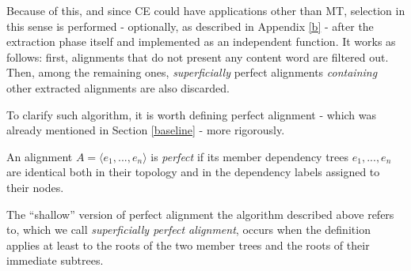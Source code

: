 Because of this, and since CE could have applications other than MT, selection in this sense is performed - optionally, as described in Appendix \ref{b} - after the extraction phase itself and implemented as an independent function. It works as follows: first, alignments that do not present any content word are filtered out. Then, among the remaining ones, \textit{superficially} perfect alignments \textit{containing} other extracted alignments are also discarded.\smallskip

To clarify such algorithm, it is worth defining perfect alignment - which was already mentioned in Section \ref{baseline} - more rigorously. \smallskip

\begin{definition}
    An alignment $A = \langle e_1,...,e_n \rangle$ is \textit{perfect} if its member dependency trees $e_1,...,e_n$ are identical both in their topology and in the dependency labels assigned to their nodes. 
\end{definition} \smallskip

The ``shallow'' version of perfect alignment the algorithm described above refers to, which we call \textit{superficially perfect alignment}, occurs when the definition applies at least to the roots of the two member trees and the roots of their immediate subtrees.\smallskip  

